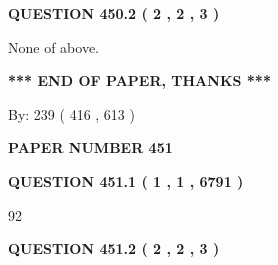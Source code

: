 \documentclass[12pt]{article}
\begin{document}
\vspace{0.2in}
  
{\textbf{\Large{QUESTION
450.2 
 ( 2 , 2 , 3 )
}}}
  
  
 
 
\noindent{}
 
 
 None of above.
 
 
 
 
   
   
 \vspace{0.2in}
 
   
   
   
   
\vspace{1.0in} 
{\textbf{\large{ *** END OF PAPER, THANKS *** }}} 
   
   
\hspace{1.0in} By: 
 239 ( 416 ,  613 )
   
   
   
   
\newpage 
\setcounter{page}{ 
   451001 } 
   
   
   
   
 {\textbf{ \Large{ PAPER NUMBER  451  }}}
   
   
\vspace{0.2in}
   
   
   
   
   
   
 \vspace{0.2in}
 
 
 
 
   
   
  
\vspace{0.2in}
  
{\textbf{\Large{QUESTION
451.1 
 ( 1 , 1 , 6791 )
}}}
  
  
 
 
\noindent{}

92
 
 
  
\vspace{0.2in}
  
{\textbf{\Large{QUESTION
451.2 
 ( 2 , 2 , 3 )
}}}
  
  
 
 
\noindent{}
 
\end{document}
